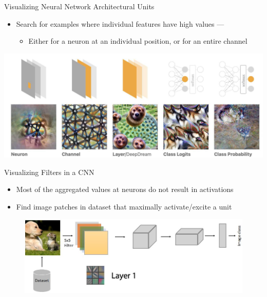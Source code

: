 \documentclass[11pt,compress,t,notes=noshow, aspectratio=169, xcolor=table]{beamer}
\begin{document}
\begin{frame}{Visualizing Neural Network Architectural Units}
    \begin{itemize}
        \item Search for examples where individual features have high values —
        \begin{itemize}
            \item Either for a neuron at an individual position, or for an entire channel
        \end{itemize}
    \end{itemize}
    
    \includegraphics[scale=.47]{img180}
\end{frame}
    
\begin{frame}{Visualizing Filters in a CNN}
    \begin{itemize}
        \item Most of the aggregated values at neurons do not result in activations
        \item Find image patches in dataset that maximally activate/excite a unit
    \end{itemize}
    \begin{figure}
        \centering
        \includegraphics[scale=.6]{Bild6}
    \end{figure}
\end{frame}
\end{document}
